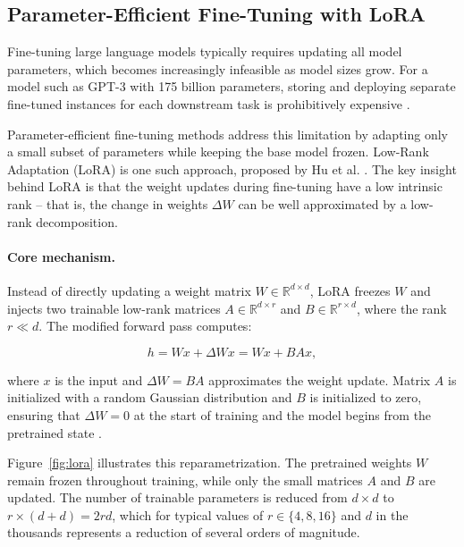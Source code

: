 \subsection{Parameter-Efficient Fine-Tuning with LoRA}

Fine-tuning large language models typically requires updating all model parameters, which becomes increasingly infeasible as model sizes grow. For a model such as GPT-3 with 175 billion parameters, storing and deploying separate fine-tuned instances for each downstream task is prohibitively expensive \cite{hu2021loralowrankadaptationlarge}.

Parameter-efficient fine-tuning methods address this limitation by adapting only a small subset of parameters while keeping the base model frozen. Low-Rank Adaptation (LoRA) is one such approach, proposed by Hu et al. \cite{hu2021loralowrankadaptationlarge}. The key insight behind LoRA is that the weight updates during fine-tuning have a low intrinsic rank -- that is, the change in weights $\Delta W$ can be well approximated by a low-rank decomposition.

\paragraph{Core mechanism.}
Instead of directly updating a weight matrix $W \in \mathbb{R}^{d \times d}$, LoRA freezes $W$ and injects two trainable low-rank matrices $A \in \mathbb{R}^{d \times r}$ and $B \in \mathbb{R}^{r \times d}$, where the rank $r \ll d$. The modified forward pass computes:

\begin{equation}
h = Wx + \Delta Wx = Wx + BAx,
\end{equation}

where $x$ is the input and $\Delta W = BA$ approximates the weight update. Matrix $A$ is initialized with a random Gaussian distribution and $B$ is initialized to zero, ensuring that $\Delta W = 0$ at the start of training and the model begins from the pretrained state \cite{hu2021loralowrankadaptationlarge}.

Figure~\ref{fig:lora} illustrates this reparametrization. The pretrained weights $W$ remain frozen throughout training, while only the small matrices $A$ and $B$ are updated. The number of trainable parameters is reduced from $d \times d$ to $r \times (d + d) = 2rd$, which for typical values of $r \in \{4, 8, 16\}$ and $d$ in the thousands represents a reduction of several orders of magnitude.

